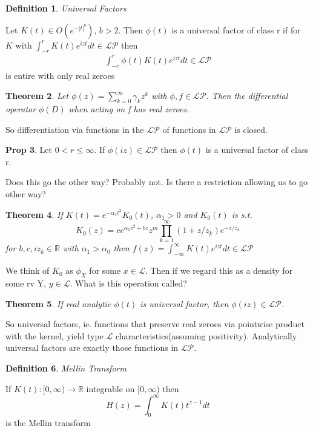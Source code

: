 \documentclass[10pt]{article}
\newcommand{\1}{\textbf{1}}
\newcommand{\R}{\mathbb{R}}
\newcommand{\pP}{\mathcal{P}}
\newcommand{\lL}{\mathcal{L}}
\newtheorem{theorem}{Theorem}
\theoremstyle{remark}
\theoremstyle{definition}
\newtheorem{definition}[theorem]{Definition}
\theoremstyle{prop}
\newtheorem{prop}[theorem]{Prop}
\theoremstyle{Corollary}
\begin{document}
\begin{definition}\textit{Universal Factors}
	
	Let $K(t) \in O(e^{-|t|^b})$, $b > 2$. Then $\phi(t)$ is a universal factor of class r if for $K$ with $\int_{-r}^r K(t) e^{izt}dt \in \lL \pP$ then
	\begin{align*}
		\int_{-r}^r \phi(t)K(t)e^{izt}dt \in \lL \pP
	\end{align*}
	is entire with only real zeroes
\end{definition}


\begin{theorem}
	Let $\phi(z) = \sum_{k=0}^{\infty} \gamma_k z^k$ with $\phi, f \in \mathcal{L}\mathcal{P}$. Then the differential operator $\phi(D)$ when acting on f has real zeroes.
\end{theorem}

So differentiation via functions in the $\lL \pP$ of functions in $\lL \pP$ is closed.

\begin{prop}

Let $0 < r \leq \infty$. If $\phi(iz) \in \lL \pP$ then $\phi(t)$ is a universal factor of class r. 
\end{prop}

Does this go the other way? Probably not. Is there a restriction allowing us to go other way?

\begin{theorem}
	If $K(t) = e^{-\alpha_1 t^2} K_0(t)$, $\alpha_1 > 0$ and $K_0(t)$ is s.t.
	\[
		K_0(z) = ce^{\alpha_0 z^2 + bz} z^m \prod_{k=1}^{\infty} (1+z/z_k) e^{-z/z_k}
	\]
	for $b,c,iz_k \in \R$ with $\alpha_1 > \alpha_0$ then $f(z) = \int_{-\infty}^{\infty}K(t) e^{izt}dt \in \lL \pP$
\end{theorem}	

We think of $K_0$ as $\phi_X$ for some $x \in \lL$. Then if we regard this as a density for some rv Y, $y \in \lL$. What is this operation called?

\begin{theorem}
	If real analytic $\phi(t)$ is universal factor, then $\phi(iz) \in \lL \pP$. 
\end{theorem}

So universal factors, ie. functions that preserve real zeroes via pointwise product with the kernel, yield type $\lL$ characteristics(assuming positivity). Analytically universal factors are exactly those functions in $\lL \pP$.

\begin{definition}\textit{Mellin Transform}
	
	If $K(t) : [0,\infty) \to \R$ integrable on $[0,\infty)$ then 
	\[
		H(z) = \int_0^{\infty}K(t)t^{z-1}dt
	\]
	is the Mellin transform
\end{definition}
\end{document}
